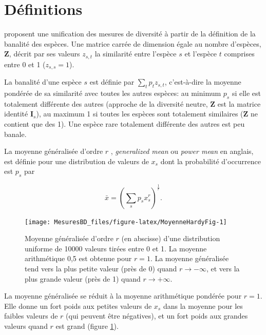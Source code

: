 \documentclass[
  11pt,
  french,
  a4paper,
  extrafontsizes,onecolumn,openright
  ]{memoir}
\begin{document}
\section{Définitions}\label{duxe9finitions}

\textcite{Leinster2012} proposent une unification des mesures de diversité à partir de la définition de la banalité des espèces.
Une matrice carrée de dimension égale au nombre d'espèces, \(\mathbf{Z}\), décrit par ses valeurs \(z_{s,t}\) la similarité entre l'espèce \(s\) et l'espèce \(t\) comprises entre 0 et 1 (\(z_{s,s}=1\)).

La banalité d'une espèce \(s\) est définie par \(\sum_t{p_t z_{s,t}}\), c'est-à-dire la moyenne pondérée de sa similarité avec toutes les autres espèces: au minimum \(p_s\) si elle est totalement différente des autres (approche de la diversité neutre, \(\mathbf{Z}\) est la matrice identité \(\mathbf{I}_s\)), au maximum 1 si toutes les espèces sont totalement similaires (\(\mathbf{Z}\) ne contient que des 1).
Une espèce rare totalement différente des autres est peu banale.

La moyenne généralisée d'ordre \(r\) \autocite{Hardy1952}, \emph{generalized mean} ou \emph{power mean} en anglais, est définie pour une distribution de valeurs de \(x_s\) dont la probabilité d'occurrence est \(p_s\) par

\begin{equation}
  \label{eq:Hardy1952}
  \bar{x}={\left(\sum_s{p_s x^r_s}\right)}^{\frac{1}{r}}.
\end{equation}



\scriptsize

\begin{figure}

{\centering \texttt{[image: MesuresBD\_files/figure-latex/MoyenneHardyFig-1]} 

}

\caption{Moyenne généralisée d'ordre \(r\) (en abscisse) d'une distribution uniforme de 10000 valeurs tirées entre 0 et 1. La moyenne arithmétique 0,5 est obtenue pour \(r=1\). La moyenne généralisée tend vers la plus petite valeur (près de 0) quand \(r\to -\infty\), et vers la plus grande valeur (près de 1) quand \(r\to +\infty\).}\label{fig:MoyenneHardyFig}
\end{figure}

\normalsize

La moyenne généralisée se réduit à la moyenne arithmétique pondérée pour \(r=1\).
Elle donne un fort poids aux petites valeurs de \(x_s\) dans la moyenne pour les faibles valeurs de \(r\) (qui peuvent être négatives), et un fort poids aux grandes valeurs quand \(r\) est grand (figure \ref{fig:MoyenneHardyFig}).
\end{document}
